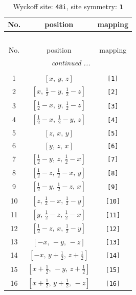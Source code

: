\documentclass[fleqn,8pt]{jsarticle}
\begin{document}
\begin{longtable}{ccc}
\caption{Wyckoff site: {\tt 48i}, site symmetry: {\tt 1}}
 \\
 \hline \hline
No. & position & mapping \\ \hline \endfirsthead

\multicolumn{2}{l}{\tablename\ \thetable{}} \\
 \hline \hline
No. & position & mapping \\ \hline \endhead

 \hline \hline
\multicolumn{2}{r}{\footnotesize\it continued ...} \\ \endfoot

 \hline \hline
\multicolumn{2}{r}{} \\ \endlastfoot

1 & $\left[ x,\, y,\, z \right]$ & {\tt [1]} \\ \hline
2 & $\left[ x,\, \frac{1}{2} - y,\, \frac{1}{2} - z \right]$ & {\tt [2]} \\ \hline
3 & $\left[ \frac{1}{2} - x,\, y,\, \frac{1}{2} - z \right]$ & {\tt [3]} \\ \hline
4 & $\left[ \frac{1}{2} - x,\, \frac{1}{2} - y,\, z \right]$ & {\tt [4]} \\ \hline
5 & $\left[ z,\, x,\, y \right]$ & {\tt [5]} \\ \hline
6 & $\left[ y,\, z,\, x \right]$ & {\tt [6]} \\ \hline
7 & $\left[ \frac{1}{2} - y,\, z,\, \frac{1}{2} - x \right]$ & {\tt [7]} \\ \hline
8 & $\left[ \frac{1}{2} - z,\, \frac{1}{2} - x,\, y \right]$ & {\tt [8]} \\ \hline
9 & $\left[ \frac{1}{2} - y,\, \frac{1}{2} - z,\, x \right]$ & {\tt [9]} \\ \hline
10 & $\left[ z,\, \frac{1}{2} - x,\, \frac{1}{2} - y \right]$ & {\tt [10]} \\ \hline
11 & $\left[ y,\, \frac{1}{2} - z,\, \frac{1}{2} - x \right]$ & {\tt [11]} \\ \hline
12 & $\left[ \frac{1}{2} - z,\, x,\, \frac{1}{2} - y \right]$ & {\tt [12]} \\ \hline
13 & $\left[ - x,\, - y,\, - z \right]$ & {\tt [13]} \\ \hline
14 & $\left[ - x,\, y + \frac{1}{2},\, z + \frac{1}{2} \right]$ & {\tt [14]} \\ \hline
15 & $\left[ x + \frac{1}{2},\, - y,\, z + \frac{1}{2} \right]$ & {\tt [15]} \\ \hline
16 & $\left[ x + \frac{1}{2},\, y + \frac{1}{2},\, - z \right]$ & {\tt [16]} \\ \hline

\end{longtable}
\end{document}
